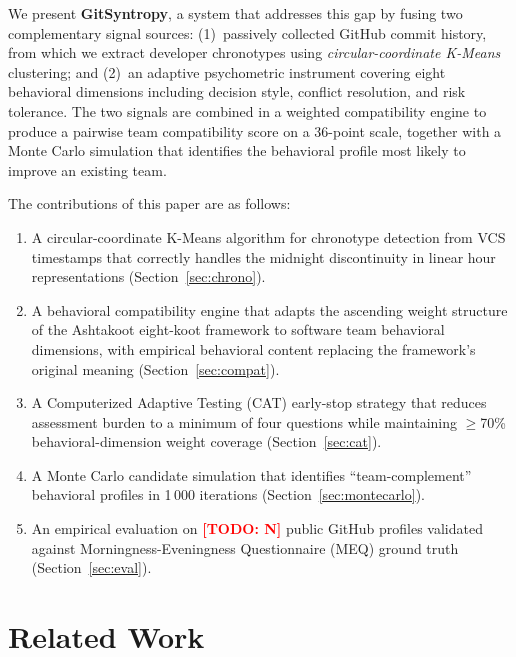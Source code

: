 \documentclass[conference]{IEEEtran}
\newcommand{\TODO}[1]{\textcolor{red}{\textbf{[TODO: #1]}}}
\begin{document}
We present \textbf{GitSyntropy}, a system that addresses this gap by
fusing two complementary signal sources: (1)~passively collected GitHub
commit history, from which we extract developer chronotypes using
\emph{circular-coordinate K-Means} clustering; and (2)~an adaptive
psychometric instrument covering eight behavioral dimensions including
decision style, conflict resolution, and risk tolerance.
The two signals are combined in a weighted compatibility engine to
produce a pairwise team compatibility score on a 36-point scale,
together with a Monte Carlo simulation that identifies the behavioral
profile most likely to improve an existing team.

The contributions of this paper are as follows:
\begin{enumerate}
  \item A circular-coordinate K-Means algorithm for chronotype
        detection from VCS timestamps that correctly handles the
        midnight discontinuity in linear hour representations
        (Section~\ref{sec:chrono}).
  \item A behavioral compatibility engine that adapts the ascending
        weight structure of the Ashtakoot eight-koot framework to
        software team behavioral dimensions, with empirical behavioral
        content replacing the framework's original meaning
        (Section~\ref{sec:compat}).
  \item A Computerized Adaptive Testing (CAT) early-stop strategy that
        reduces assessment burden to a minimum of four questions while
        maintaining $\ge$70\% behavioral-dimension weight coverage
        (Section~\ref{sec:cat}).
  \item A Monte Carlo candidate simulation that identifies
        ``team-complement'' behavioral profiles in 1\,000 iterations
        (Section~\ref{sec:montecarlo}).
  \item An empirical evaluation on \TODO{N} public GitHub profiles
        validated against Morningness-Eveningness Questionnaire (MEQ)
        ground truth (Section~\ref{sec:eval}).
\end{enumerate}

\section{Related Work}
\label{sec:related}
\end{document}
